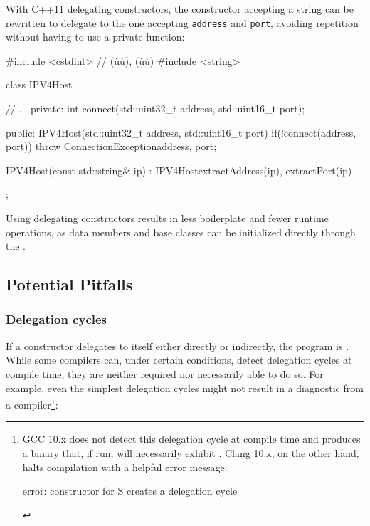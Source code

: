 \noindent With C++11 delegating constructors, the constructor accepting a string can be rewritten to
delegate to the one accepting \lstinline!address! and \lstinline!port!,
avoiding repetition without having to use a private function:

\begin{emcppslisting}[language=C++]
#include <cstdint> // (ù{}ù), (ù{}ù)
#include <string>

class IPV4Host
{
     // ...
private:
    int connect(std::uint32_t address, std::uint16_t port);

public:
    IPV4Host(std::uint32_t address, std::uint16_t port)
    {
        if(!connect(address, port))
        {
            throw ConnectionException{address, port};
        }
    }

    IPV4Host(const std::string& ip)
        : IPV4Host{extractAddress(ip), extractPort(ip)}
    {
    }
};
\end{emcppslisting}

\noindent Using delegating constructors results in less boilerplate and fewer runtime
operations, as data members and base classes can be initialized
directly through the .

\subsection[Potential Pitfalls]{Potential Pitfalls}\label{ctordelegrating-potential-pitfalls}

\subsubsection[Delegation cycles]{Delegation cycles}\label{delegation-cycles}

If a constructor delegates to itself either directly or indirectly, the
program is . While some compilers can, under certain conditions, detect delegation cycles at compile time, they are neither
required nor necessarily able to do so. For example, even the simplest delegation cycles might not result in a diagnostic from a compiler{\cprotect\footnote{GCC 10.x does not detect this delegation
cycle at compile time and produces a binary that, if run, will
necessarily exhibit . Clang 10.x, on the
other hand, halts compilation with a helpful error message:

\begin{emcppslisting}[style=plain, basicstyle={\ttfamily\footnotesize}]
error: constructor for S creates a delegation cycle
\end{emcppslisting}\vspace*{-1ex}
      }}:

